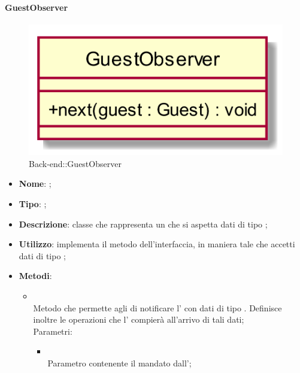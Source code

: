 \hypertarget{GuestObserver_label}{\paragraph{GuestObserver}}
\begin{figure}[h]
	\centering
	\includegraphics[width=\textwidth,height=\textheight,keepaspectratio]{images/ClassGuestObserver.png}
	\caption{Back-end::GuestObserver}
\end{figure}
\begin{itemize}
	\item \textbf{Nome}: ;
	\item \textbf{Tipo}: ;
	\item \textbf{Descrizione}: classe che rappresenta un  che si aspetta dati di tipo ;
	\item \textbf{Utilizzo}: implementa il metodo  dell'interfaccia, in maniera tale che accetti dati di tipo ;
	\item \textbf{Metodi}:
	\begin{itemize}
		\item[]  \\
		Metodo che permette agli  di notificare l' con dati di tipo . Definisce inoltre le operazioni che l' compierà all'arrivo di tali dati;\\
		Parametri:
		\begin{itemize}
			\item {} \\
			Parametro contenente il  mandato dall';
		\end{itemize}
	\end{itemize}
\end{itemize}

